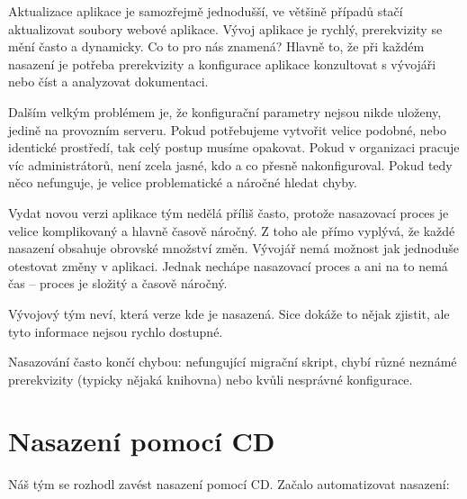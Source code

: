 Aktualizace aplikace je samozřejmě jednodušší, ve většině případů stačí aktualizovat soubory webové aplikace. Vývoj aplikace je rychlý, prerekvizity se mění často a dynamicky. Co to pro nás znamená? Hlavně to, že při každém nasazení je potřeba prerekvizity a konfigurace aplikace konzultovat s vývojáři nebo číst a analyzovat dokumentaci. 

Dalším velkým problémem je, že konfigurační parametry nejsou nikde uloženy, jedině na provozním serveru. Pokud potřebujeme vytvořit velice podobné, nebo identické prostředí, tak celý postup musíme opakovat. Pokud v organizaci pracuje víc administrátorů, není zcela jasné, kdo a co přesně nakonfiguroval. Pokud tedy něco nefunguje, je velice problematické a náročné hledat chyby.

Vydat novou verzi aplikace tým nedělá příliš často, protože nasazovací proces je velice komplikovaný a hlavně časově náročný. Z toho ale přímo vyplývá, že každé nasazení obsahuje obrovské množství změn. Vývojář nemá možnost jak jednoduše otestovat změny v aplikaci. Jednak nechápe nasazovací proces a ani na to nemá čas -- proces je složitý a časově náročný. 

Vývojový tým neví, která verze kde je nasazená. Sice dokáže to nějak zjistit, ale tyto informace nejsou rychlo dostupné. 

Nasazování často končí chybou: nefungující migrační skript, chybí různé neznámé prerekvizity (typicky nějaká knihovna) nebo kvůli nesprávné konfigurace.

\section{Nasazení pomocí CD}
Náš tým se rozhodl zavést nasazení pomocí CD. Začalo automatizovat nasazení:

